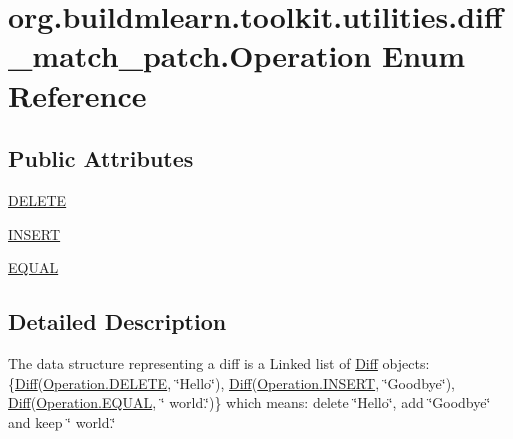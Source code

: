 \hypertarget{enumorg_1_1buildmlearn_1_1toolkit_1_1utilities_1_1diff__match__patch_1_1Operation}{}\section{org.\+buildmlearn.\+toolkit.\+utilities.\+diff\+\_\+match\+\_\+patch.\+Operation Enum Reference}
\label{enumorg_1_1buildmlearn_1_1toolkit_1_1utilities_1_1diff__match__patch_1_1Operation}
\subsection*{Public Attributes}
\begin{DoxyCompactItemize}
\item 
\hyperlink{enumorg_1_1buildmlearn_1_1toolkit_1_1utilities_1_1diff__match__patch_1_1Operation_abb2a34981d1741bf8946af42cd6250af}{D\+E\+L\+E\+TE}
\item 
\hyperlink{enumorg_1_1buildmlearn_1_1toolkit_1_1utilities_1_1diff__match__patch_1_1Operation_a8b05eca1ef092d3c04fe906fc76f15ce}{I\+N\+S\+E\+RT}
\item 
\hyperlink{enumorg_1_1buildmlearn_1_1toolkit_1_1utilities_1_1diff__match__patch_1_1Operation_aeba482dacb92381cbd25d9b956c43cd8}{E\+Q\+U\+AL}
\end{DoxyCompactItemize}


\subsection{Detailed Description}
The data structure representing a diff is a Linked list of \hyperlink{classorg_1_1buildmlearn_1_1toolkit_1_1utilities_1_1diff__match__patch_1_1Diff}{Diff} objects\+: \{\hyperlink{classorg_1_1buildmlearn_1_1toolkit_1_1utilities_1_1diff__match__patch_1_1Diff}{Diff}(\hyperlink{enumorg_1_1buildmlearn_1_1toolkit_1_1utilities_1_1diff__match__patch_1_1Operation_abb2a34981d1741bf8946af42cd6250af}{Operation.\+D\+E\+L\+E\+TE}, \char`\"{}\+Hello\char`\"{}), \hyperlink{classorg_1_1buildmlearn_1_1toolkit_1_1utilities_1_1diff__match__patch_1_1Diff}{Diff}(\hyperlink{enumorg_1_1buildmlearn_1_1toolkit_1_1utilities_1_1diff__match__patch_1_1Operation_a8b05eca1ef092d3c04fe906fc76f15ce}{Operation.\+I\+N\+S\+E\+RT}, \char`\"{}\+Goodbye\char`\"{}), \hyperlink{classorg_1_1buildmlearn_1_1toolkit_1_1utilities_1_1diff__match__patch_1_1Diff}{Diff}(\hyperlink{enumorg_1_1buildmlearn_1_1toolkit_1_1utilities_1_1diff__match__patch_1_1Operation_aeba482dacb92381cbd25d9b956c43cd8}{Operation.\+E\+Q\+U\+AL}, \char`\"{} world.\char`\"{})\} which means\+: delete \char`\"{}\+Hello\char`\"{}, add \char`\"{}\+Goodbye\char`\"{} and keep \char`\"{} world.\char`\"{} 


